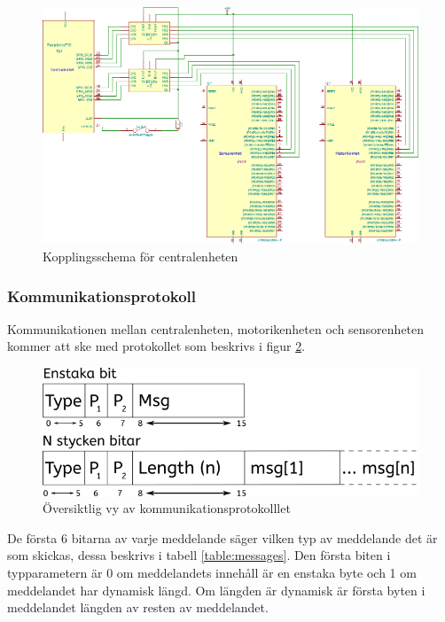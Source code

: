 \documentclass[a4paper,titlepage,12pt]{article}
\begin{document}
	\begin{figure}[htpb]
		\centering
		\includegraphics[width=1.0\linewidth]{charts/central/centralenhet.pdf}
		\caption{Kopplingsschema för centralenheten}
		\label{fig:central_circuit}
	\end{figure}




	\subsubsection{Kommunikationsprotokoll}
	\label{ssub:Kommunikationsprotokoll}
	Kommunikationen mellan centralenheten, motorikenheten och sensorenheten kommer att ske 
	med protokollet som beskrivs i figur \ref{fig:kommunikation1}.

	\newpage
	\begin{figure}[h!]
		\centering
		\includegraphics[width=0.5\linewidth]{images/communication_protocol1.png}
		\caption{Översiktlig vy av kommunikationsprotokolllet}
		\label{fig:kommunikation1}
	\end{figure}

	De första 6 bitarna av varje meddelande säger vilken typ av meddelande det är som
	skickas, dessa beskrivs i tabell 
	\ref{table:messages}. Den första biten i typparametern är 0 om meddelandets
	innehåll är en enstaka byte och 1 om meddelandet har dynamisk längd. Om längden
	är dynamisk är första byten i meddelandet längden av resten av meddelandet.
\end{document}
